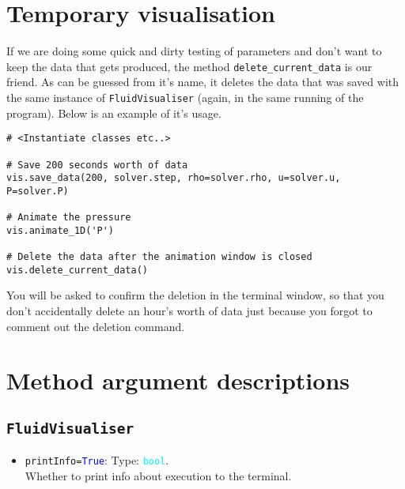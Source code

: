 \documentclass{article}
\newcommand{\ttt}[1]{\texttt{#1}}
\newcommand{\ptype}[1]{\texttt{\textcolor{cyan}{#1}}}
\newcommand{\cbl}[1]{\textcolor{blue}{#1}}
\newcommand{\cro}[1]{\textcolor{RedOrange}{#1}}
\begin{document}
\section{Temporary visualisation}
\label{sec:temp}
If we are doing some quick and dirty testing of parameters and don't want to keep the data that gets produced, the method \ttt{delete\_current\_data} is our friend. As can be guessed from it's name, it deletes the data that was saved with the same instance of \ttt{FluidVisualiser} (again, in the same running of the program). Below is an example of it's usage.\\
\begin{minipage}{\linewidth}
\begin{lstlisting}
# <Instantiate classes etc..>

# Save 200 seconds worth of data
vis.save_data(200, solver.step, rho=solver.rho, u=solver.u, P=solver.P)

# Animate the pressure
vis.animate_1D('P')

# Delete the data after the animation window is closed
vis.delete_current_data()
\end{lstlisting}
\end{minipage}
You will be asked to confirm the deletion in the terminal window, so that you don't accidentally delete an hour's worth of data just because you forgot to comment out the deletion command.

\section{Method argument descriptions}
\label{sec:margs}
\subsection{\ttt{FluidVisualiser}}
\label{sec:const}
\begin{itemize}
	\item \ttt{\cro{printInfo}=\cbl{True}}: Type: \ptype{bool}.\\Whether to print info about execution to the terminal.
\end{itemize}
\end{document}
